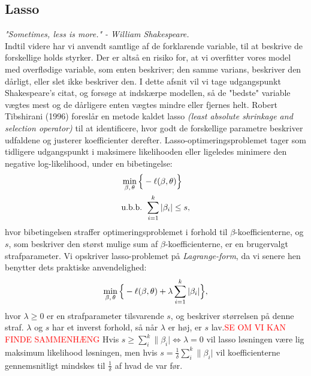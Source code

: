 \documentclass[11pt,a4paper]{article}
\begin{document}
\subsection{Lasso}
\textit{"Sometimes, less is more." - William Shakespeare.}\\
Indtil videre har vi anvendt samtlige af de forklarende variable, til at beskrive de forskellige holds styrker. Der er altså en risiko for, at vi overfitter vores model med overflødige variable, som enten beskriver; den samme varians, beskriver den dårligt, eller slet ikke beskriver den. I dette afsnit vil vi tage udgangspunkt Shakespeare's citat, og forsøge at indskærpe modellen, så de "bedste" variable vægtes mest og de dårligere enten vægtes mindre eller fjernes helt. Robert Tibshirani (1996) foreslår en metode kaldet lasso \textit{(least absolute shrinkage and selection operator)} til at identificere, hvor godt de forskellige parametre beskriver udfaldene og justerer koefficienter derefter. Lasso-optimeringsproblemet tager som tidligere udgangspunkt i maksimere likelihooden eller ligeledes minimere den negative log-likelihood, under en bibetingelse:
\begin{align*}
&\min_{\beta,\,\theta} \Big{\{}-\ell(\beta,\theta)\Big{\}} \\
&\text{u.b.b. }\sum_{i=1}^k|\beta_i|\leq s,
\end{align*}
hvor bibetingelsen straffer optimeringsproblemet i forhold til $\beta$-koefficienterne, og $s$, som beskriver den størst mulige sum af $\beta$-koefficienterne, er en brugervalgt strafparameter. 
Vi opskriver lasso-problemet på \textit{Lagrange-form}, da vi senere hen benytter dets praktiske anvendelighed:
\begin{align*}
\min_{\beta,\,\theta} \Big{\{}-\ell(\beta,\theta)+\lambda\sum_{i=1}^k|\beta_i|\Big{\}},
\end{align*}
hvor $\lambda\geq0$ er en strafparameter tilsvarende $s$, og beskriver størrelsen på denne straf. $\lambda$ og $s$ har et inverst forhold, så når $\lambda$ er høj, er $s$ lav.\textcolor{red}{SE OM VI KAN FINDE SAMMENHÆNG} Hvis $s\geq\sum_i^k\|\beta_i|\iff \lambda=0$ vil lasso løsningen være lig maksimum likelihood løsningen, men hvis $s=\frac{1}{\delta}\sum_i^k\|\beta_i|$ vil koefficienterne gennemsnitligt mindskes til $\frac{1}{\delta}$ af hvad de var før.
\end{document}

